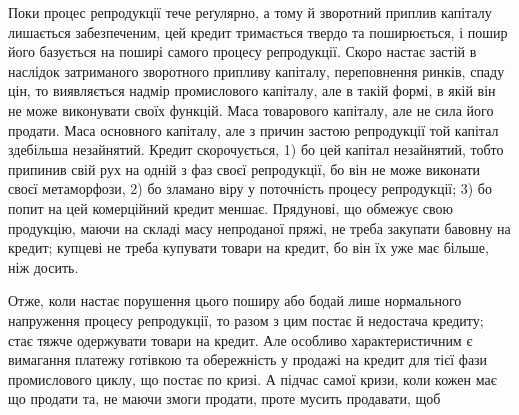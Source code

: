 Поки процес репродукції тече реґулярно, а тому й зворотний приплив капіталу
лишається забезпеченим, цей кредит тримається твердо та поширюється, і пошир
його базується на поширі самого процесу репродукції. Скоро настає застій
в наслідок затриманого зворотного припливу капіталу, переповнення ринків, спаду
цін, то виявляється надмір промислового капіталу, але в такій формі, в якій він
не може виконувати своїх функцій. Маса товарового капіталу, але не сила
його продати. Маса основного капіталу, але з причин застою репродукції той
капітал здебільша незайнятий. Кредит скорочується, 1) бо цей капітал незайнятий,
тобто припинив свій рух на одній з фаз своєї репродукції, бо він не може
виконати своєї метаморфози, 2) бо зламано віру у поточність процесу репродукції;
3) бо попит на цей комерційний кредит меншає. Прядунові, що обмежує
свою продукцію, маючи на складі масу непроданої пряжі, не треба закупати
бавовну на кредит; купцеві не треба купувати товари на кредит, бо він їх
уже має більше, ніж досить.

Отже, коли настає порушення цього поширу або бодай лише нормального
напруження процесу репродукції, то разом з цим постає й недостача кредиту;
стає тяжче одержувати товари на кредит. Але особливо характеристичним є вимагання
платежу готівкою та обережність у продажі на кредит для тієї фази
промислового циклу, що постає по кризі. А підчас самої кризи, коли кожен
має що продати та, не маючи змоги продати, проте мусить продавати, щоб
\parbreak{}  %
